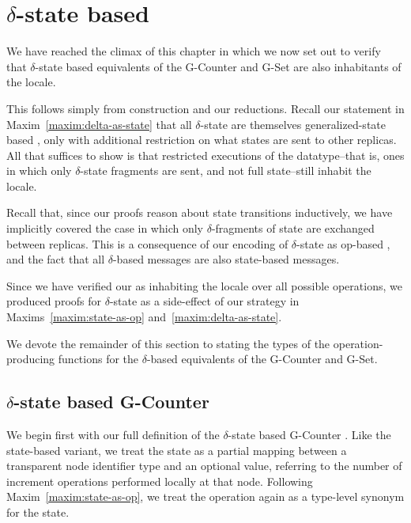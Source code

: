 \section{$\delta$-state based \CRDTs}
\label{sec:isabelle-delta-crdts}

We have reached the climax of this chapter in which we now set out to verify
that $\delta$-state based \CRDT equivalents of the G-Counter and G-Set are also
inhabitants of the \SEC locale.

This follows simply from construction and our reductions. Recall our statement
in Maxim~\ref{maxim:delta-as-state} that all $\delta$-state \CRDTs are
themselves generalized-state based \CRDTs, only with additional restriction on
what states are sent to other replicas. All that suffices to show is that
restricted executions of the datatype--that is, ones in which only
$\delta$-state fragments are sent, and not full state--still inhabit the \SEC
locale.

Recall that, since our proofs reason about state transitions inductively, we
have implicitly covered the case in which only $\delta$-fragments of state are
exchanged between replicas. This is a consequence of our encoding of
$\delta$-state \CRDTs as op-based \CRDTs, and the fact that all $\delta$-based
\CRDT messages are also state-based \CRDT messages.

Since we have verified our \CRDTs as inhabiting the \SEC locale over all
possible operations, we produced proofs for $\delta$-state \CRDTs as a
side-effect of our strategy in Maxims~\ref{maxim:state-as-op}
and~\ref{maxim:delta-as-state}.

We devote the remainder of this section to stating the types of the
operation-producing functions for the $\delta$-based \CRDT equivalents of the
G-Counter and G-Set.

\subsection{$\delta$-state based G-Counter}
\label{sec:isabelle-delta-gcounter}

We begin first with our full definition of the $\delta$-state based G-Counter
\CRDT. Like the state-based variant, we treat the state as a partial mapping
between a transparent node identifier type and an optional value, referring to
the number of increment operations performed locally at that node. Following
Maxim~\ref{maxim:state-as-op}, we treat the operation again as a type-level
synonym for the state.

